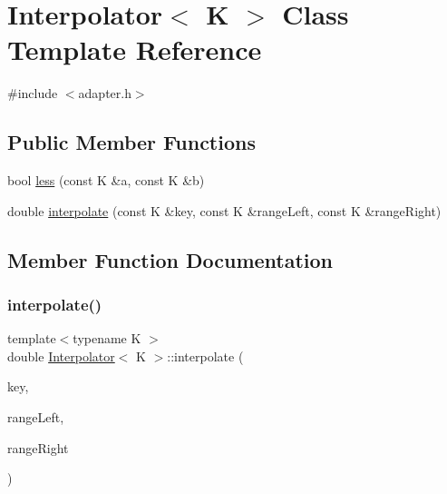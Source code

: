 \hypertarget{classInterpolator}{}\section{Interpolator$<$ K $>$ Class Template Reference}
\label{classInterpolator}


{\ttfamily \#include $<$adapter.\+h$>$}

\subsection*{Public Member Functions}
\begin{DoxyCompactItemize}
\item 
bool \hyperlink{classInterpolator_ab74a6b4cd4b2b7e55221e03c047df9cf}{less} (const K \&a, const K \&b)
\item 
double \hyperlink{classInterpolator_aabce270c5424b02c90905f7a7b2848e8}{interpolate} (const K \&key, const K \&range\+Left, const K \&range\+Right)
\end{DoxyCompactItemize}


\subsection{Member Function Documentation}
\mbox{\label{classInterpolator_aabce270c5424b02c90905f7a7b2848e8}} 
\subsubsection{\texorpdfstring{interpolate()}{interpolate()}}
{\footnotesize\ttfamily template$<$typename K $>$ \\
double \hyperlink{classInterpolator}{Interpolator}$<$ K $>$\+::interpolate (\begin{DoxyParamCaption}\item[{const K \&}]{key,  }\item[{const K \&}]{range\+Left,  }\item[{const K \&}]{range\+Right }\end{DoxyParamCaption})}

\mbox{\label{classInterpolator_ab74a6b4cd4b2b7e55221e03c047df9cf}} 
